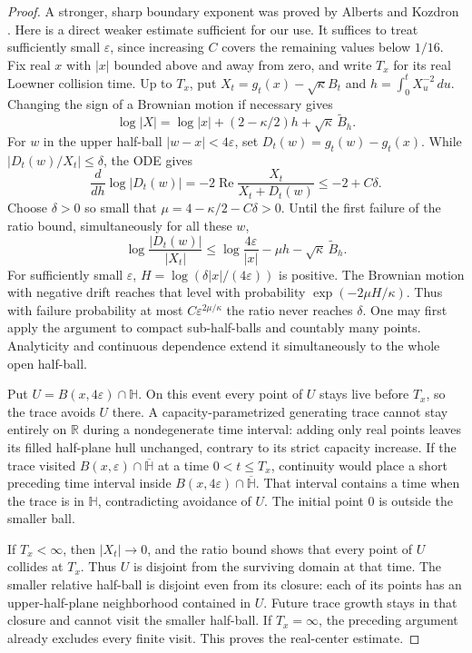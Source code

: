 \begin{proof}
A stronger, sharp boundary exponent was proved by Alberts and
Kozdron \cite[Theorem~3.2 and Corollary~5.1]{albertskozdron2008}.
Here is a direct weaker estimate sufficient for our use.
It suffices to treat sufficiently small $\varepsilon$, since increasing
$C$ covers the remaining values below $1/16$.
Fix real $x$ with $|x|$ bounded above and away from zero, and write
$T_x$ for its real Loewner collision time. Up to $T_x$, put
$X_t=g_t(x)-\sqrt\kappa B_t$ and
$h=\int_0^tX_u^{-2}\,du$. Changing the sign of a Brownian motion
if necessary gives
\[
 \log|X|=\log|x|+(2-\kappa/2)h+\sqrt\kappa\,\widetilde B_h.
\]
For $w$ in the upper half-ball $|w-x|<4\varepsilon$, set
$D_t(w)=g_t(w)-g_t(x)$. While $|D_t(w)/X_t|\le\delta$, the ODE
gives
\[
 \frac{d}{dh}\log|D_t(w)|
      =-2\operatorname{Re}\frac{X_t}{X_t+D_t(w)}
      \le-2+C\delta.
\]
Choose $\delta>0$ so small that
$\mu=4-\kappa/2-C\delta>0$. Until the first failure of the ratio
bound, simultaneously for all these $w$,
\[
 \log\frac{|D_t(w)|}{|X_t|}
 \le\log\frac{4\varepsilon}{|x|}
             -\mu h-\sqrt\kappa\,\widetilde B_h.
\]
For sufficiently small $\varepsilon$,
$H=\log(\delta|x|/(4\varepsilon))$ is positive.  The Brownian motion
with negative drift reaches that level with probability
$\exp(-2\mu H/\kappa)$. Thus with failure
probability at most $C\varepsilon^{2\mu/\kappa}$ the ratio never
reaches $\delta$. One may first apply the argument to compact
sub-half-balls and countably many points. Analyticity and continuous
dependence extend it simultaneously to the whole open half-ball.

Put $U=B(x,4\varepsilon)\cap\mathbb H$.  On this event every point of
$U$ stays live before $T_x$, so the trace avoids $U$ there.  A
capacity-parametrized generating trace cannot stay entirely on
$\mathbb R$ during a nondegenerate time interval: adding only real
points leaves its filled half-plane hull unchanged, contrary to its
strict capacity increase.  If the trace visited
$B(x,\varepsilon)\cap\overline{\mathbb H}$ at a time $0<t\le T_x$,
continuity would place a short preceding time interval inside
$B(x,4\varepsilon)\cap\overline{\mathbb H}$.  That interval contains a
time when the trace is in $\mathbb H$, contradicting avoidance of $U$.
The initial point $0$ is outside the smaller ball.

If $T_x<\infty$, then $|X_t|\to0$, and the ratio bound shows that every
point of $U$ collides at $T_x$.  Thus $U$ is disjoint from the surviving
domain at that time.  The smaller relative half-ball is disjoint even
from its closure: each of its points has an upper-half-plane neighborhood
contained in $U$.  Future trace growth stays in that closure and cannot
visit the smaller half-ball.  If $T_x=\infty$, the preceding argument
already excludes every finite visit.  This proves the real-center estimate.


\end{proof}
